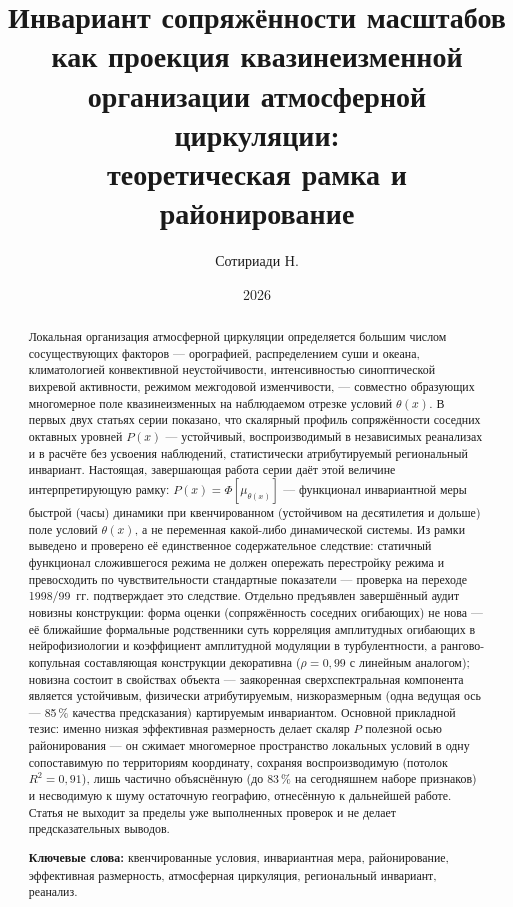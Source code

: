 \documentclass[11pt,a4paper]{article}
\title{Инвариант сопряжённости масштабов как проекция квазинеизменной\\
организации атмосферной циркуляции:\\
теоретическая рамка и районирование}
\author{Сотириади Н.}
\date{2026}
\begin{document}
\maketitle

\begin{abstract}
Локальная организация атмосферной циркуляции определяется большим числом сосуществующих факторов --- орографией, распределением суши и океана, климатологией конвективной неустойчивости, интенсивностью синоптической вихревой активности, режимом межгодовой изменчивости, --- совместно образующих многомерное поле квазинеизменных на наблюдаемом отрезке условий $\theta(x)$. В первых двух статьях серии показано, что скалярный профиль сопряжённости соседних октавных уровней $P(x)$ --- устойчивый, воспроизводимый в независимых реанализах и в расчёте без усвоения наблюдений, статистически атрибутируемый региональный инвариант. Настоящая, завершающая работа серии даёт этой величине интерпретирующую рамку: $P(x)=\Phi[\mu_{\theta(x)}]$ --- функционал инвариантной меры быстрой (часы) динамики при квенчированном (устойчивом на десятилетия и дольше) поле условий $\theta(x)$, а не переменная какой-либо динамической системы. Из рамки выведено и проверено её единственное содержательное следствие: статичный функционал сложившегося режима не должен опережать перестройку режима и превосходить по чувствительности стандартные показатели --- проверка на переходе 1998/99~гг. подтверждает это следствие. Отдельно предъявлен завершённый аудит новизны конструкции: форма оценки (сопряжённость соседних огибающих) не нова --- её ближайшие формальные родственники суть корреляция амплитудных огибающих в нейрофизиологии и коэффициент амплитудной модуляции в турбулентности, а рангово-копульная составляющая конструкции декоративна ($\rho=0{,}99$ с линейным аналогом); новизна состоит в свойствах объекта --- заякоренная сверхспектральная компонента является устойчивым, физически атрибутируемым, низкоразмерным (одна ведущая ось --- 85\,\% качества предсказания) картируемым инвариантом. Основной прикладной тезис: именно низкая эффективная размерность делает скаляр $P$ полезной осью районирования --- он сжимает многомерное пространство локальных условий в одну сопоставимую по территориям координату, сохраняя воспроизводимую (потолок $R^2=0{,}91$), лишь частично объяснённую (до 83\,\% на сегодняшнем наборе признаков) и несводимую к шуму остаточную географию, отнесённую к дальнейшей работе. Статья не выходит за пределы уже выполненных проверок и не делает предсказательных выводов.

\smallskip
\noindent\textbf{Ключевые слова:} квенчированные условия, инвариантная мера, районирование, эффективная размерность, атмосферная циркуляция, региональный инвариант, реанализ.
\end{abstract}
\end{document}
